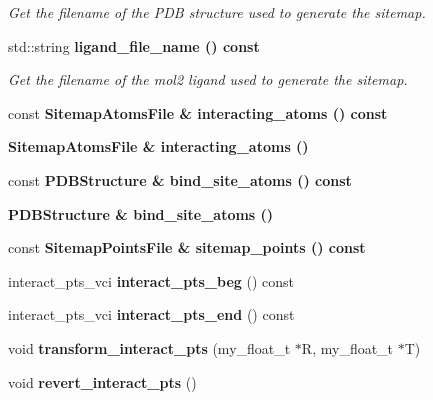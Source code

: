 \begin{CompactItemize}
\begin{CompactList}\small\item\em Get the filename of the PDB structure used to generate the sitemap. \item\end{CompactList}\item 
std::string \bf{ligand\_\-file\_\-name} () const \label{classASCbase_1_1Sitemap_cb41876f6caf930dbfd134532ba02a0c}

\begin{CompactList}\small\item\em Get the filename of the mol2 ligand used to generate the sitemap. \item\end{CompactList}\item 
const \bf{Sitemap\-Atoms\-File} \& \textbf{interacting\_\-atoms} () const \label{classASCbase_1_1Sitemap_8cef15e389674f18b95f808397f30163}

\item 
\bf{Sitemap\-Atoms\-File} \& \textbf{interacting\_\-atoms} ()\label{classASCbase_1_1Sitemap_49015f2e7b31c7f19a0a47abc9af3db2}

\item 
const \bf{PDBStructure} \& \textbf{bind\_\-site\_\-atoms} () const \label{classASCbase_1_1Sitemap_e56f41b7103116460be52ca6be7f2549}

\item 
\bf{PDBStructure} \& \textbf{bind\_\-site\_\-atoms} ()\label{classASCbase_1_1Sitemap_7c01c7079e267cf260d1c7e255ae6b6f}

\item 
const \bf{Sitemap\-Points\-File} \& \textbf{sitemap\_\-points} () const \label{classASCbase_1_1Sitemap_5bdd019adc94558d333e1b988a574b32}

\item 
interact\_\-pts\_\-vci \textbf{interact\_\-pts\_\-beg} () const \label{classASCbase_1_1Sitemap_a7ad7e74e6ef0cdfb3e8e487e2db6200}

\item 
interact\_\-pts\_\-vci \textbf{interact\_\-pts\_\-end} () const \label{classASCbase_1_1Sitemap_fe90bda50b24ac3ecfa92df9d698b7d1}

\item 
void \textbf{transform\_\-interact\_\-pts} (my\_\-float\_\-t $\ast$R, my\_\-float\_\-t $\ast$T)\label{classASCbase_1_1Sitemap_dbd2a6cb931e9a427fa8543216600632}

\item 
void \textbf{revert\_\-interact\_\-pts} ()\label{classASCbase_1_1Sitemap_ec8a4a45362b46f0fd2f25db0876f488}


\end{CompactItemize}
